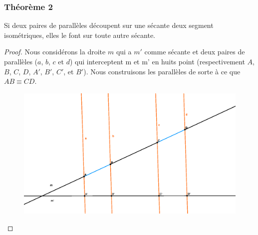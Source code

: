 \documentclass[a4paper,12pt]{article}
\begin{document}
\pagebreak
\subsubsection{Théorème 2}
\begin{theorem}\label{semblableTh2}
Si deux paires de parallèles découpent sur une sécante deux segment isométriques, elles le font sur toute autre sécante.
\end{theorem}

\begin{proof}
Nous considérons la droite $m$ qui a $m'$ comme sécante et deux paires de parallèles ($a$, $b$, $c$ et $d$) qui interceptent m et m' en huits point (respectivement $A$, $B$, $C$, $D$, $A'$, $B'$, $C'$, et $B'$). Nous construisons les parallèles de sorte à ce que $AB \equiv CD$.

\begin{figure}[H]
        \centering
        \includegraphics[scale=0.2]{semblable2.1.eps}
    \end{figure}


\end{proof}
\end{document}

